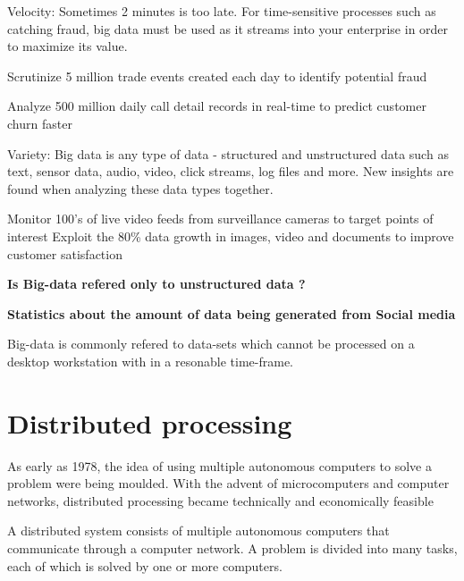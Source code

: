 \documentclass[12pt,a4paper]{report}
\begin{document}
Velocity: Sometimes 2 minutes is too late. For time-sensitive processes such as catching fraud,
big data must be used as it streams into your enterprise in order to maximize its value.

Scrutinize 5 million trade events created each day to identify potential fraud

Analyze 500 million daily call detail records in real-time to predict customer churn faster


Variety: Big data is any type of data - structured and unstructured data such as text,
sensor data, audio, video, click streams, log files and more. New insights are found when
analyzing these data types together.

Monitor 100’s of live video feeds from surveillance cameras to target points of interest
Exploit the 80\% data growth in images, video and documents to improve customer satisfaction






\cite{website:ibm-bigdata} 

{\bf Is Big-data refered only to unstructured data ?}


{\bf Statistics about the amount of data being generated from Social media}

Big-data is commonly refered to data-sets which cannot be processed on a
desktop workstation with in a resonable time-frame.

\section{Distributed processing}

As early as 1978, the idea of using multiple autonomous computers to solve a problem were being
moulded. With the  advent  of  microcomputers and computer networks, distributed processing
became technically and economically feasible \cite{chu1978distributed}

A distributed system consists of multiple autonomous computers that communicate through a computer network.
A problem is divided into many tasks, each of which is solved by one or more computers.
\end{document}
